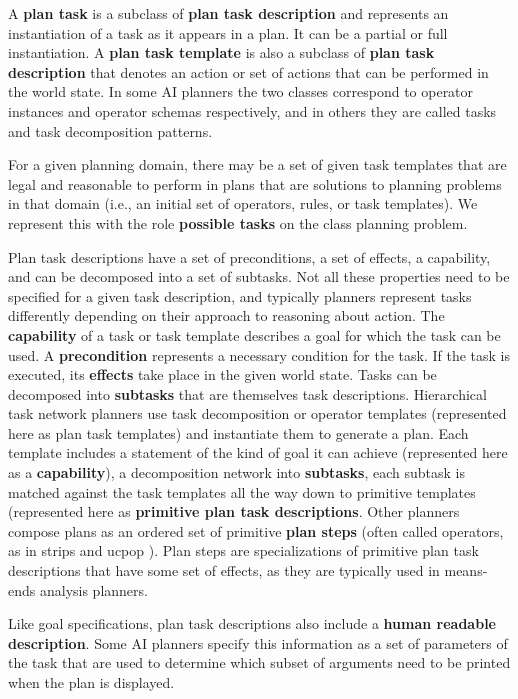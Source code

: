 A {\bf plan task} is a subclass of {\bf plan task description}
and represents an instantiation
of a task as it appears in a plan. It can be a partial or full
instantiation.
A {\bf plan task template} is also a subclass of 
{\bf plan task description} that denotes an action or set
of actions that can be performed
in the world state.  
In some AI planners the two classes
correspond to operator instances and operator schemas respectively, and
in others they are called tasks and task decomposition
patterns.

For a given planning domain, 
there may be a set of given task templates that are legal
and reasonable to perform in plans that are solutions to planning
problems in that domain
(i.e., an initial set of operators, rules, or task templates).  
We represent this with the role {\bf possible tasks}
on the class planning problem.

Plan task descriptions have a set of preconditions, 
a set of effects,
a capability, 
and can be decomposed into a set of subtasks.  
Not all these properties need to be specified 
for a given task description,
and typically planners represent tasks differently depending on 
their approach to reasoning about action.
The {\bf capability} of a task or task template
describes a goal for which the task can be used.
A {\bf precondition} represents a necessary condition for the task.
If the task is executed, its {\bf effects} take place in 
the given world state.
Tasks can be decomposed into {\bf subtasks}
that are themselves task descriptions.
Hierarchical task network planners use task decomposition 
or operator templates 
(represented here as plan task templates) and 
instantiate them to generate a plan.  Each template includes a
statement of the kind of goal it can achieve 
(represented here as a {\bf capability}), 
a decomposition
network into {\bf subtasks}, each subtask is matched against the 
task templates all the way down to primitive templates
(represented here as {\bf primitive plan task descriptions}.
Other planners compose plans as an ordered set of primitive {\bf plan steps}
(often called operators, as in {\sc strips} and {\sc ucpop} \cite{weld94}).  
Plan steps are specializations of primitive plan task descriptions that have 
some set of effects, as they are typically used in means-ends analysis planners.  

Like goal specifications, plan task descriptions also include a
{\bf human readable description}.
Some AI planners specify this information as a set of parameters
of the task that are used to determine which subset of arguments 
need to be printed when the plan is displayed.


